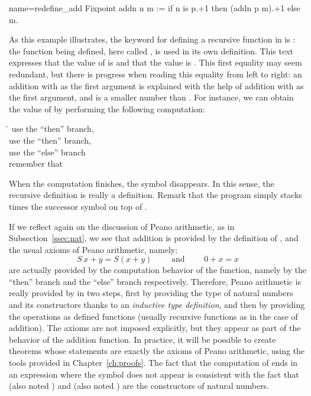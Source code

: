 \begin{coq}{name=redefine_add}{}
Fixpoint addn n m :=
  if n is p.+1 then (addn p m).+1 else m.
\end{coq}
As this example illustrates, the keyword for defining a recursive
function in \Coq{} is : the function being
defined, here called , is used in its own definition.
This text expresses that the value of  is
 and that the value  is .
This first equality may
seem redundant, but there is progress when reading this equality from
left to right: an addition with  as the first argument
is explained with the help of addition with  as the first
argument, and  is a smaller number than .  For instance,
we can obtain the value of  by performing the following
computation:
\begin{tabbing}
\=\kill
{} \> use the ``then'' branch, \\
 \> use the ``then'' branch, \\
 \> use the ``else'' branch\\
\> remember that 
\end{tabbing}
When the computation finishes, the symbol  disappears.  In
this sense, the recursive definition is really a definition.  Remark that
the  program simply stacks  times the successor symbol
on top of .

If we reflect again on the discussion of Peano arithmetic, as in
Subsection~\ref{ssec:nat}, we see that addition is provided by the
definition of , and the usual axioms of Peano arithmetic, namely:
\[S~ x + y = S (x + y) \qquad \text{ and } \qquad 0 + x = x \]
are actually provided by the computation behavior of the function,
namely by the ``then'' branch and the ``else'' branch respectively.
Therefore, Peano arithmetic is really provided by \Coq{} in two steps,
first by providing the type of natural numbers and its constructors
thanks to an \emph{inductive type definition}, and then by providing
the operations as defined functions (usually recursive functions as in
the case of addition).  The axioms are not imposed explicitly,
but they appear as part of the behavior of the addition function.  In
practice, it will be possible to create theorems whose statements are
exactly the axioms of Peano arithmetic, using the tools provided in
Chapter~\ref{ch:proofs}.  The fact that the computation of  ends in an expression where the  symbol does not appear
is consistent with the fact that  (also noted ) and 
(also noted ) are the constructors of natural numbers.

